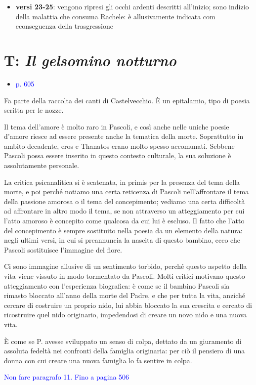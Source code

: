 \documentclass[a4paper, twoside, titlepage]{book}
\newcommand{\elenco}[1]{%
\begin{itemize}
#1
\end{itemize}}
\renewcommand{\emph}[1]{\textcolor{blue}{#1}}
\begin{document}
\elenco{\item \textbf{versi 23-25}: vengono ripresi gli occhi ardenti descritti all'inizio; sono indizio della malattia che consuma Rachele: è allusivamente indicata com econseguenza della trasgressione}

\chapter{T: \textit{Il gelsomino notturno}}
\elenco{\item \emph{p. 605}}

Fa parte della raccolta dei canti di Castelvecchio.
È un epitalamio, tipo di poesia scritta per le nozze.

Il tema dell'amore è molto raro in Pascoli, e così anche nelle uniche poesie d'amore riesce ad essere presente anche la tematica della morte.
Soprattutto in ambito decadente, eros e Thanatos erano molto spesso accomunati. Sebbene Pascoli possa essere inserito in questo contesto culturale, la sua soluzione è assolutamente personale.

La critica psicanalitica si è scatenata, in primis per la presenza del tema della morte, e poi perché notiamo una certa reticenza di Pascoli nell'affrontare il tema della passione amorosa o il tema del concepimento; vediamo una certa difficoltà ad affrontare in altro modo il tema, se non attraverso un atteggiamento per cui l'atto amoroso è concepito come qualcosa da cui lui è escluso.
Il fatto che l'atto del concepimento è sempre sostituito nella poesia da un elemento della natura: negli ultimi versi, in cui si preannuncia la nascita di questo bambino, ecco che Pascoli sostituisce l'immagine del fiore.

Ci sono immagine allusive di un sentimento torbido, perché questo aspetto della vita viene vissuto in modo tormentato da Pascoli. Molti critici motivano questo atteggiamento con l'esperienza biografica: è come se il bambino Pascoli sia rimasto bloccato all'anno della morte del Padre, e che per tutta la vita, anziché cercare di costruire un proprio nido, lui abbia bloccato la sua crescita e cercato di ricostruire quel nido originario, impedendosi di creare un novo nido e una nuova vita.

È come se P. avesse sviluppato un senso di colpa, dettato da un giuramento di assoluta fedeltà nei confronti della famiglia originaria: per ciò il pensiero di una donna con cui creare una nuova famiglia lo fa sentire in colpa.

\emph{Non fare paragrafo 11. Fino a pagina 506}
\end{document}
